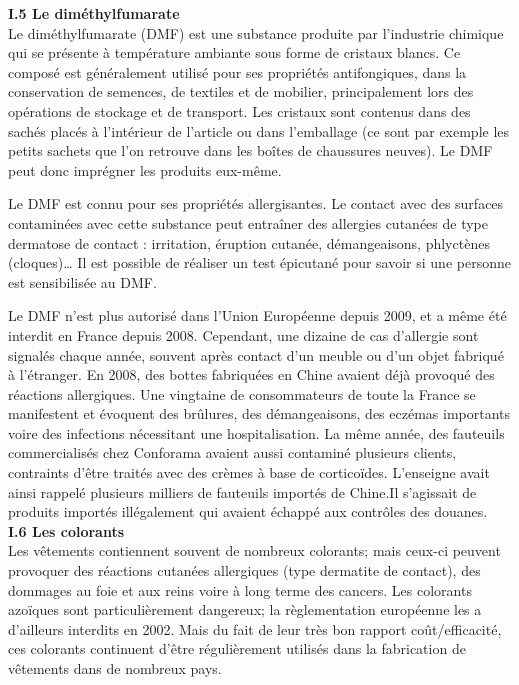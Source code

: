 \documentclass[8pt]{article}
\begin{document}
\textbf{I.5 Le diméthylfumarate}\\


Le diméthylfumarate (DMF) est une substance produite par l’industrie chimique qui se présente à température ambiante sous forme de cristaux blancs. Ce composé est généralement utilisé pour ses propriétés antifongiques, dans la conservation de semences, de textiles et de mobilier, principalement lors des opérations de stockage et de transport. Les cristaux sont contenus dans des sachés placés à l’intérieur de l’article ou dans l’emballage (ce sont par exemple les petits sachets que l’on retrouve dans les boîtes de chaussures neuves). Le DMF peut donc imprégner les produits eux-même.

Le DMF est connu pour ses propriétés allergisantes. Le contact avec des surfaces contaminées avec cette substance peut entraîner des allergies cutanées de type dermatose de contact : irritation, éruption cutanée, démangeaisons, phlyctènes (cloques)… Il est possible de réaliser un test épicutané pour savoir si une personne est sensibilisée au DMF.

Le DMF n’est plus autorisé dans l’Union Européenne depuis 2009, et a même été interdit en France depuis 2008. Cependant, une dizaine de cas d’allergie sont signalés chaque année, souvent après contact d’un meuble ou d’un objet fabriqué à l’étranger. En 2008, des bottes fabriquées en Chine avaient déjà provoqué des réactions allergiques. Une vingtaine de consommateurs de toute la France se manifestent et évoquent des brûlures, des démangeaisons, des eczémas importants voire des infections nécessitant une hospitalisation. La même année, des fauteuils commercialisés chez Conforama avaient aussi contaminé plusieurs clients, contraints d’être traités avec des crèmes à base de corticoïdes. L’enseigne avait ainsi rappelé plusieurs milliers de fauteuils importés de Chine.Il s’agissait de produits importés illégalement qui avaient échappé aux contrôles des douanes.\\


\textbf{I.6 Les colorants}\\


Les vêtements contiennent souvent de nombreux colorants; mais ceux-ci peuvent provoquer des réactions cutanées allergiques (type dermatite de contact), des dommages au foie et aux reins voire à long terme des cancers. Les colorants azoïques sont particulièrement dangereux; la règlementation européenne les a d’ailleurs interdits en 2002. Mais du fait de leur très bon rapport coût/efficacité, ces colorants continuent d’être régulièrement utilisés dans la fabrication de vêtements dans de nombreux pays.\\
\end{document}
